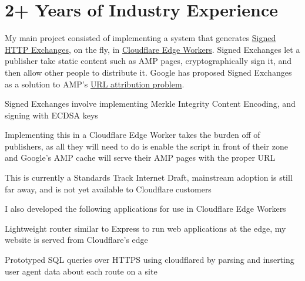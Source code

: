\documentclass[letterpaper]{deedy-resume} %
\begin{document}
\begin{minipage}[t]{0.64\textwidth} %


\section{2+ Years of Industry Experience}


\sectionspace
My main project consisted of implementing a system that generates \href{https://tools.ietf.org/html/draft-yasskin-http-origin-signed-responses-04}{Signed HTTP Exchanges}, on the fly, in \href{https://developers.cloudflare.com/workers/}{Cloudflare Edge Workers}. Signed Exchanges let a publisher take static content such as AMP pages, cryptographically sign it, and then allow other people to distribute it. Google has proposed Signed Exchanges as a solution to AMP's \href{https://80x24.net/post/the-problem-with-amp/}{URL attribution problem}. 
\sectionspace
\begin {tightitemize}
\item Signed Exchanges involve implementing Merkle Integrity Content Encoding, and signing with ECDSA keys
\item Implementing this in a Cloudflare Edge Worker takes the burden off of publishers, as all they will need to do is enable the script in front of their zone and Google's AMP cache will serve their AMP pages with the proper URL
\item This is currently a Standards Track Internet Draft, mainstream adoption is still far away, and is not yet available to Cloudflare customers
\end {tightitemize}
I also developed the following applications for use in Cloudflare Edge Workers
\begin {tightitemize}
\item Lightweight router similar to Express to run web applications at the edge, my website is served from Cloudflare's edge
\item Prototyped SQL queries over HTTPS using cloudflared by parsing and inserting user agent data about each route on a site
\end {tightitemize}
\sectionspace
{}


\end{minipage}
\end{document}
